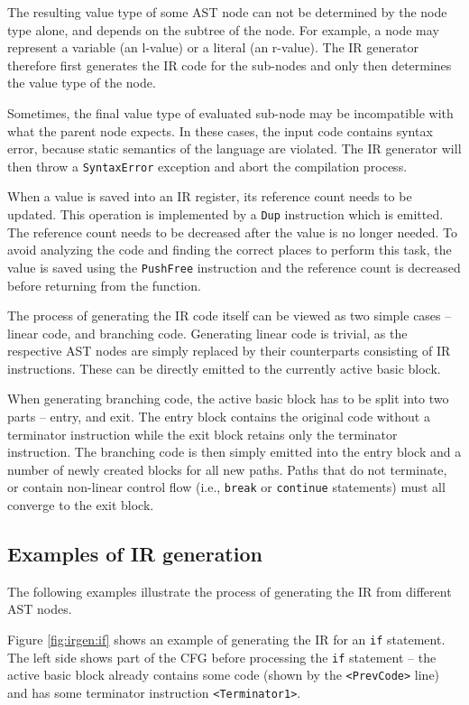 The resulting value type of some AST node can not be determined by the node type alone, and depends on the subtree of the node. For example, a \nonterminal[PrimaryExpression]{}{} node may represent a variable (an l-value) or a literal (an r-value). The IR generator therefore first generates the IR code for the sub-nodes and only then determines the value type of the node.

Sometimes, the final value type of evaluated sub-node may be incompatible with what the parent node expects. In these cases, the input code contains syntax error, because static semantics of the language are violated. The IR generator will then throw a \texttt{SyntaxError} exception and abort the compilation process.

When a value is saved into an IR register, its reference count needs to be updated. This operation is implemented by a \texttt{Dup} instruction which is emitted. The reference count needs to be decreased after the value is no longer needed. To avoid analyzing the code and finding the correct places to perform this task, the value is saved using the \texttt{PushFree} instruction and the reference count is decreased before returning from the function.

The process of generating the IR code itself can be viewed as two simple cases -- linear code, and branching code. Generating linear code is trivial, as the respective AST nodes are simply replaced by their counterparts consisting of IR instructions. These can be directly emitted to the currently active basic block.

When generating branching code, the active basic block has to be split into two parts -- entry, and exit. The entry block contains the original code without a terminator instruction while the exit block retains only the terminator instruction. The branching code is then simply emitted into the entry block and a number of newly created blocks for all new paths. Paths that do not terminate, or contain non-linear control flow (i.e., \texttt{break} or \texttt{continue} statements) must all converge to the exit block.


\subsection{Examples of IR generation}

The following examples illustrate the process of generating the IR from different AST nodes.

Figure \ref{fig:irgen:if} shows an example of generating the IR for an \texttt{if} statement. The left side shows part of the CFG before processing the \texttt{if} statement -- the active basic block already contains some code (shown by the \texttt{<PrevCode>} line) and has some terminator instruction \texttt{<Terminator1>}.

